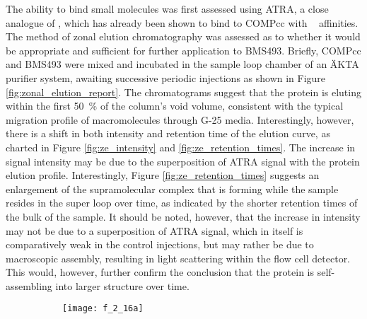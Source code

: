 \begin{refsection}
The ability to bind small molecules was first assessed using ATRA, a close
analogue of , which has already been shown to bind to
COMPcc with \si{\micro\moLar}
affinities.\cite{Guo1998,Haghpanah2010,Gunasekar2009} The method of zonal
elution chromatography was assessed as to whether it would be appropriate and
sufficient for further application to BMS493. Briefly, COMPcc and BMS493 were
mixed and incubated in the sample loop chamber of an \"{A}KTA purifier system,
awaiting successive periodic injections as shown in Figure
\ref{fig:zonal_elution_report}. The chromatograms suggest that the protein is
eluting within the first \SI{50}{\percent} of the column's void volume,
consistent with the typical migration profile of macromolecules through G-25
media. Interestingly, however, there is a shift in both intensity and retention
time of the elution curve, as charted in Figure \ref{fig:ze_intensity} and
\ref{fig:ze_retention_times}. The increase in signal intensity may be due to the
superposition of ATRA signal with the protein elution profile. Interestingly,
Figure \ref{fig:ze_retention_times} suggests an enlargement of the
supramolecular complex that is forming while the sample resides in the super
loop over time, as indicated by the shorter retention times of the bulk of the
sample. It should be noted, however, that the increase in intensity may not be
due to a superposition of ATRA signal, which in itself is comparatively weak
in the control injections, but may rather be due to macroscopic assembly,
resulting in light scattering within the flow cell detector. This would,
however, further confirm the conclusion that the protein is self-assembling into
larger structure over time.
\begin{figure}[h!]
    \centering
    \begin{subfigure}[b]{0.75\textwidth}
        \texttt{[image: f\_2\_16a]}
        \caption{}
        \label{fig:zonal_elution_chrom}
    \end{subfigure}


\end{figure}
\end{refsection}

